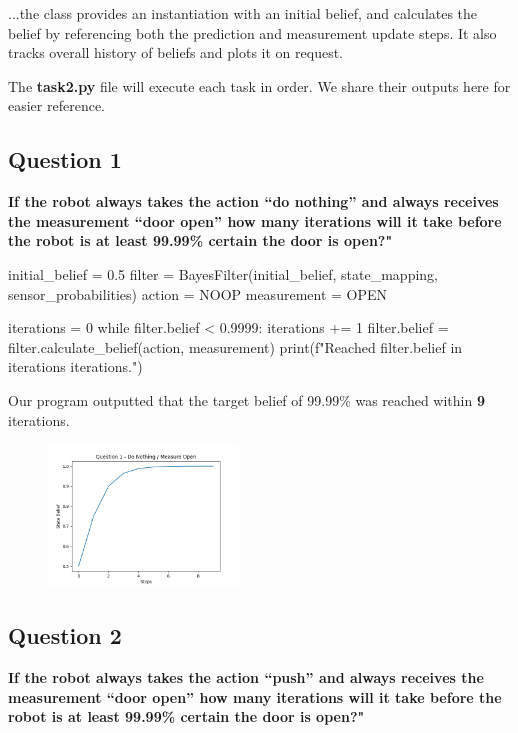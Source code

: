 \documentclass{article}
\begin{document}
...the class provides an instantiation with an initial belief, and calculates the belief by referencing both the prediction and measurement update steps. It also tracks overall history of beliefs and plots it on request.

The \textbf{task2.py} file will execute each task in order. We share their outputs here for easier reference.

\subsection*{Question 1}

\textbf{If the robot always takes the action “do nothing” and always receives the measurement “door open” how many iterations will it take before the robot is at least 99.99\% certain the door is open?"}

\begin{python}
    initial_belief = 0.5
    filter = BayesFilter(initial_belief, state_mapping, sensor_probabilities)
    action = NOOP
    measurement = OPEN

    iterations = 0
    while filter.belief < 0.9999:
    iterations += 1
    filter.belief = filter.calculate_belief(action, measurement)
    print(f"Reached {filter.belief} in {iterations} iterations.")
\end{python}

Our program outputted that the target belief of 99.99\% was reached within \textbf{9} iterations.


\begin{figure}[H]
    \centering
    \includegraphics[width = 0.45\textwidth]{q1.png}
\end{figure}

\subsection*{Question 2}
\textbf{If the robot always takes the action “push” and always receives the measurement “door open” how many iterations will it take before the robot is at least 99.99\% certain the door is open?"}
\end{document}
